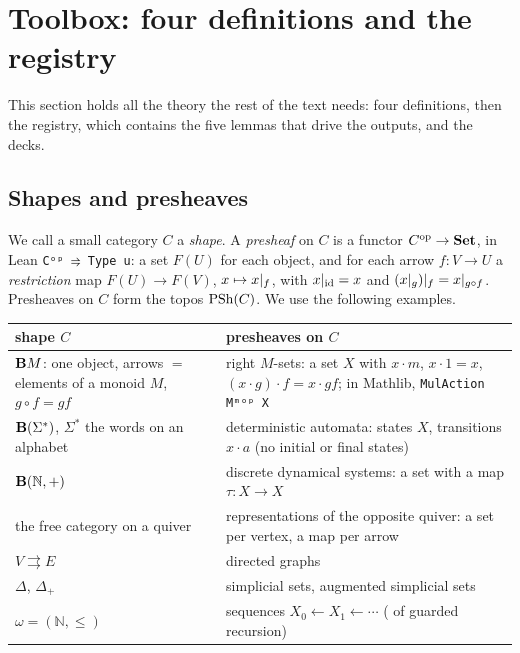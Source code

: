 \section{Toolbox: four definitions and the registry}\label{sec:toolbox}

This section holds all the theory the rest of the text needs: four definitions, then the registry, which contains the five lemmas that drive the outputs, and the decks.

\subsection{Shapes and presheaves}

We call a small category $C$ a \emph{shape}. A \emph{presheaf} on $C$ is a functor $C^{\mathrm{op}}\to\mathbf{Set}$, in Lean \texttt{Cᵒᵖ ⥤ Type u}: a set $F(U)$ for each object, and for each arrow $f : V\to U$ a \emph{restriction} map $F(U)\to F(V)$, $x\mapsto x|_{f}$, with $x|_{\mathrm{id}} = x$ and $(x|_{g})|_{f} = x|_{g\circ f}$. Presheaves on $C$ form the topos $\mathrm{PSh}(C)$. We use the following examples.

\begin{center}\small
\begin{tabularx}{\linewidth}{>{\raggedright\arraybackslash}p{4.3cm}>{\raggedright\arraybackslash}X}
\toprule
shape $C$ & presheaves on $C$\\
\midrule
$\mathbf{B} M$: one object, arrows $=$ elements of a monoid $M$, $g\circ f = gf$ & right $M$-sets: a set $X$ with $x\cdot m$, $x\cdot 1 = x$, $(x\cdot g)\cdot f = x\cdot gf$; in Mathlib, \texttt{MulAction Mᵐᵒᵖ X}\\
$\mathbf{B}(\Sigma^*)$, $\Sigma^*$ the words on an alphabet & deterministic automata: states $X$, transitions $x\cdot a$ (no initial or final states)\\
$\mathbf{B}(\mathbb N,+)$ & discrete dynamical systems: a set with a map $\tau : X\to X$\\
the free category on a quiver & representations of the opposite quiver: a set per vertex, a map per arrow\\
$V\rightrightarrows E$ & directed graphs\\
$\Delta$, $\Delta_+$ & simplicial sets, augmented simplicial sets\\
$\omega = (\mathbb N,\le)$ & sequences $X_0\leftarrow X_1\leftarrow\cdots$ (\q{the topos of trees} of guarded recursion)\\
\bottomrule
\end{tabularx}
\end{center}

